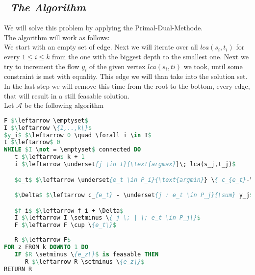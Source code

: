 \subsection*{\itshape~The Algorithm}

We will solve this problem by applying the Primal-Dual-Methode.\\

The algorithm will work as follows:\\
We start with an empty set of edge. Next we will iterate over all $lca(s_i,t_i)$ for every $1 \leq i \leq k$
from the one with the biggest depth to the smallest one. Next we try to increment the flow $y_i$
of the given vertex $lca(s_i,ti)$ we took, until some constraint is met with equality. This edge
we will than take into the solution set. In the last step we will remove this time from the root to the
bottom, every edge, that will result in a still feasable solution.\\

Let $\mathcal{A}$ be the following algorithm\\

\begin{lstlisting}[language=Pascal]
F $\leftarrow \emptyset$
I $\leftarrow \{1,..,k\}$
$y_i$ $\leftarrow 0 \quad \forall i \in I$
t $\leftarrow$ 0
WHILE $I \not = \emptyset$ connected DO
   t $\leftarrow$ k + 1
   i $\leftarrow \underset{j \in I}{\text{argmax}}\; lca(s_j,t_j)$

   $e_t$ $\leftarrow \underset{e_t \in P_i}{\text{argmin}} \{ c_{e_t}-\underset{j:e_t\in P_j}{\sum} y_j\}$

   $\Delta$ $\leftarrow c_{e_t} - \underset{j : e_t \in P_j}{\sum} y_j$

   $f_i$ $\leftarrow f_i + \Delta$
   I $\leftarrow I \setminus \{ j \; | \; e_t \in P_j\}$
   F $\leftarrow F \cup \{e_t\}$
   
   R $\leftarrow F$
FOR z FROM k DOWNTO 1 DO
   IF $R \setminus \{e_z\}$ is feasable THEN
      R $\leftarrow R \setminus \{e_z\}$
RETURN R
\end{lstlisting}
